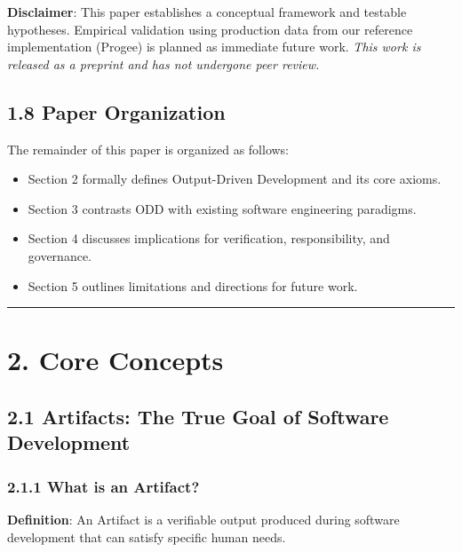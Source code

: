 \documentclass[
]{article}
\begin{document}
\textbf{Disclaimer}: This paper establishes a conceptual framework and
testable hypotheses. Empirical validation using production data from our
reference implementation (Progee) is planned as immediate future work.
\emph{This work is released as a preprint and has not undergone peer
review.}

\hypertarget{18-paper-organization}{%
\subsection{1.8 Paper Organization}\label{18-paper-organization}}

The remainder of this paper is organized as follows:

\begin{itemize}
\item
  Section 2 formally defines Output-Driven Development and its core
  axioms.
\item
  Section 3 contrasts ODD with existing software engineering paradigms.
\item
  Section 4 discusses implications for verification, responsibility, and
  governance.
\item
  Section 5 outlines limitations and directions for future work.
\end{itemize}

\begin{center}\rule{0.5\linewidth}{0.5pt}\end{center}

\hypertarget{2-core-concepts}{%
\section{2. Core Concepts}\label{2-core-concepts}}

\hypertarget{21-artifacts-the-true-goal-of-software-development}{%
\subsection{2.1 Artifacts: The True Goal of Software
Development}\label{21-artifacts-the-true-goal-of-software-development}}

\hypertarget{211-what-is-an-artifact}{%
\subsubsection{2.1.1 What is an
Artifact?}\label{211-what-is-an-artifact}}

\textbf{Definition}: An Artifact is a verifiable output produced during
software development that can satisfy specific human needs.
\end{document}

